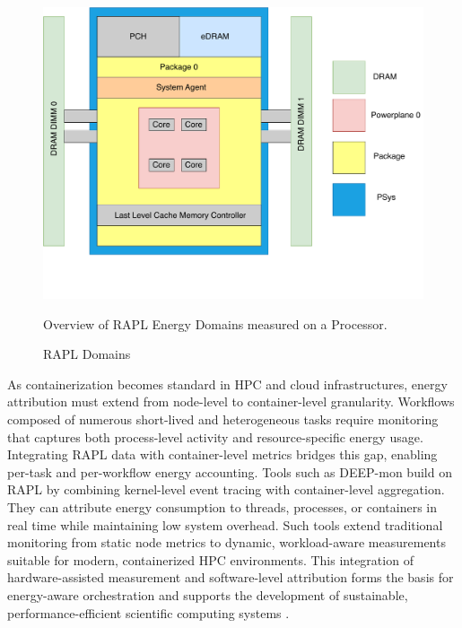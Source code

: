 \begin{figure}[H]
    \centering
    \includegraphics[scale=0.4]{fig/02/02-rapl.pdf}
    \small
    \caption{RAPL Domains}
    \label{fig:02-rapl}
    \tiny
    Overview of RAPL Energy Domains measured on a Processor.
\end{figure}

As containerization becomes standard in HPC and cloud infrastructures, energy attribution must extend from node-level to container-level granularity. Workflows composed of numerous short-lived and heterogeneous tasks require monitoring that captures both process-level activity and resource-specific energy usage. Integrating RAPL data with container-level metrics bridges this gap, enabling per-task and per-workflow energy accounting.
Tools such as DEEP-mon build on RAPL by combining kernel-level event tracing with container-level aggregation. They can attribute energy consumption to threads, processes, or containers in real time while maintaining low system overhead. Such tools extend traditional monitoring from static node metrics to dynamic, workload-aware measurements suitable for modern, containerized HPC environments. This integration of hardware-assisted measurement and software-level attribution forms the basis for energy-aware orchestration and supports the development of sustainable, performance-efficient scientific computing systems \cite{8425477}.

